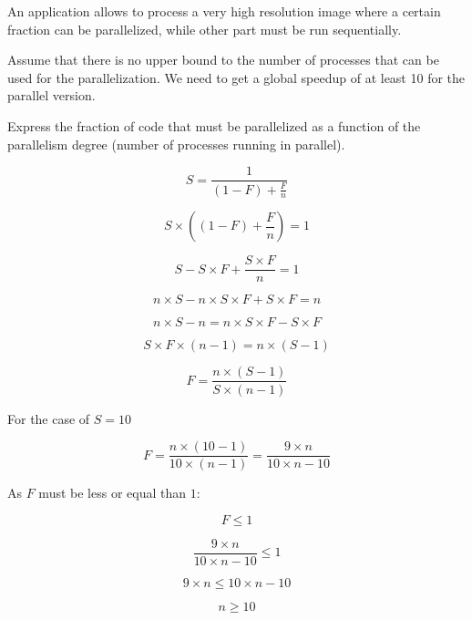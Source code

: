 \begin{acexercise}\end{acexercise}

An application allows to process a very high resolution image where a certain
fraction can be parallelized, while other part must be run sequentially. 

Assume that there is no upper bound to the number of processes that can be used
for the parallelization. We need to get a global speedup of at least 10 for
the parallel version. 

Express the fraction of code that must be parallelized as a function of the
parallelism degree (number of processes running in parallel).


\begin{acsolution}\end{acsolution}

\[
S = \frac{1}{\left(1 - F \right) + \displaystyle \frac{F}{n} }
\]

\[
S \times \left( (1-F) + \frac{F}{n} \right) = 1
\]

\[
S - S \times F + \frac{S \times F}{n} = 1
\]

\[
n \times S - n \times S \times F + S \times F = n
\]

\[
n \times S - n = n \times S \times F - S \times F
\]

\[
S \times F \times \left( n - 1 \right) = n \times \left( S - 1 \right)
\]

\[
F = \frac{n \times (S-1)}{S \times(n-1)}
\]

For the case of $S = 10$

\[
F = \frac{n \times (10-1)}{10 \times (n-1)} = 
\frac{9 \times n}{10 \times n - 10}
\]

As $F$ must be less or equal than $1$:

\[
F \leq 1
\]

\[
\frac{9 \times n}{10 \times n -10} \leq 1
\]

\[
9 \times n \leq 10 \times n-10
\]

\[
n \geq 10
\]



